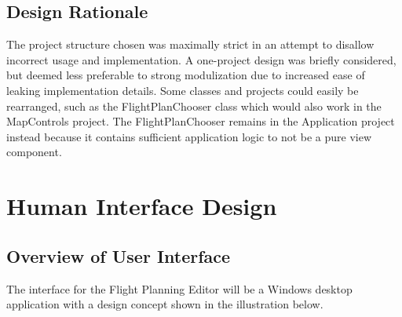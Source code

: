 \documentclass[12pt, letterpaper]{article}
\begin{document}
\subsection{Design Rationale}
The project structure chosen was maximally strict in an attempt to disallow incorrect usage and implementation.
A one-project design was briefly considered, but deemed less preferable to strong modulization due to increased ease of leaking implementation details.
Some classes and projects could easily be rearranged,
such as the FlightPlanChooser class which would also work in the MapControls project.
The FlightPlanChooser remains in the Application project instead because it contains sufficient application logic to not be a pure view component.


\clearpage
\section{Human Interface Design} \label{sec:ui}
\subsection{Overview of User Interface}
The interface for the Flight Planning Editor will be a Windows desktop application with a design concept shown in the illustration below.
\end{document}
